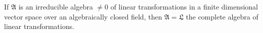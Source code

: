If $\mathfrak{A}$ is an irreducible algebra $\neq 0$ of linear transformations in a finite dimensional vector space over an algebraically closed field, then $\mathfrak{A} = \mathfrak{L}$ the complete algebra of linear transformations.
